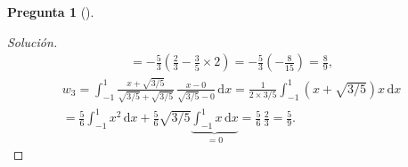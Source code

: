 \documentclass[letter,12pt]{article}
\theoremstyle{definition}
\newtheorem{question}{Pregunta}
\numberwithin{equation}{question}
\newenvironment{solution}{\begin{proof}[Solución]}{\end{proof}}
\begin{document}
\begin{question}[]
\begin{solution}
\begin{multline*}
= -\frac{5}{3} \left( \frac{2}{3} - \frac{3}{5}\times 2\right)
= -\frac{5}{3} \left(-\frac{8}{15}\right) = \frac{8}{9},
\end{multline*}
%
\begin{multline*}
w_3 = \int_{-1}^1 \frac{x+\sqrt{3/5}}{\sqrt{3/5}+\sqrt{3/5}} \, \frac{x-0}{\sqrt{3/5}-0} \, \mathrm{d}x
= \frac{1}{2\times 3/5} \int_{-1}^1 \left(x+\sqrt{3/5}\right) x \, \mathrm{d}x\\
= \frac{5}{6} \int_{-1}^1 x^2 \, \mathrm{d}x + \frac{5}{6} \sqrt{3/5} \underbrace{\int_{-1}^1 x \, \mathrm{d}x}_{= 0} = \frac{5}{6} \, \frac{2}{3} = \frac{5}{9}.
\end{multline*}
\end{solution}
\end{question}
\end{document}
